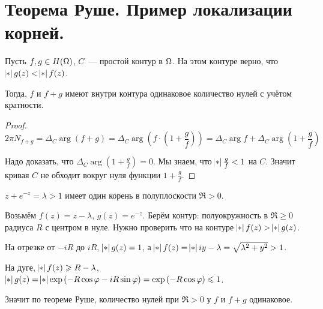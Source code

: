 \section{Теорема Руше. Пример локализации корней.}

\begin{theorem}[Руше]

    Пусть $f, g \in H(\Omega)$,
    $C$~--- простой контур в $\Omega$.
    На этом контуре верно, что $\abs{g(z)} < \abs{f(z)}$.

    Тогда, $f$ и $f+g$ имеют внутри контура одинаковое количество
    нулей с учётом кратности.
\end{theorem}

\begin{proof}

    \[
        2\pi N_{f+g} = \Delta_C \arg(f+g)
        = \Delta_C \arg\left(f \cdot \left(1 + \frac{g}{f}\right)\right)
        = \Delta_C \arg f + \Delta_C \arg \left(1 + \frac{g}{f}\right)
    \]

    Надо доказать, что $\Delta_C \arg \left(1 + \frac gf\right) = 0$.
    Мы знаем, что $\abs{\frac gf} < 1$ на $C$.
    Значит кривая $C$ не обходит вокруг нуля функции $1 + \frac gf$.
\end{proof}

\begin{example}
    $z + e^{-z} = \lambda > 1$ имеет один корень в
    полуплоскости $\Re > 0$.

    Возьмём $f(z) = z - \lambda$, $g(z) = e^{-z}$.
    Берём контур: полуокружность в $\Re \ge 0$
    радиуса $R$ с центром в нуле. Нужно проверить что
    на контуре $\abs{f(z)} > \abs{g(z)}$.

    На отрезке от $-iR$ до $iR$, $\abs{g(z)} = 1$,
    а $\abs{f(z)} = \abs{iy - \lambda} = \sqrt{\lambda^2 + y^2} > 1$.

    На дуге, $\abs{f(z)} \ge R - \lambda$,
    $\abs{g(z)} = \abs{\exp \left(-R\cos \varphi -iR\sin \varphi\right) }
        = \exp\left(-R\cos\varphi\right) \le 1$.

    Значит по теореме Руше, количество нулей при $\Re > 0$
    у $f$ и $f+g$ одинаковое.
\end{example}

\newpage
